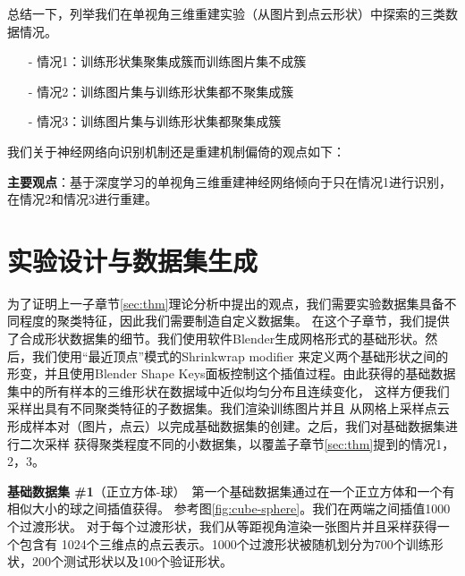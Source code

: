 \documentclass[bachelor, nocolorlinks, printoneside]{seuthesis} %
\begin{document}
\begin{Main}
总结一下，列举我们在单视角三维重建实验（从图片到点云形状）中探索的三类数据情况。
\label{sec:case}
\begin{itemize}
    \item[-] 情况1\label{sec:case1}：训练形状集聚集成簇而训练图片集不成簇
    \item[-] 情况2\label{sec:case2}：训练图片集与训练形状集都不聚集成簇
    \item[-] 情况3\label{sec:case3}：训练图片集与训练形状集都聚集成簇
\end{itemize}

我们关于神经网络向识别机制还是重建机制偏倚的观点如下：

\textbf{主要观点}：基于深度学习的单视角三维重建神经网络倾向于只在情况1进行识别，在情况2和情况3进行重建。


\section{实验设计与数据集生成}\label{sec:dataset}

为了证明上一子章节\ref{sec:thm}理论分析中提出的观点，我们需要实验数据集具备不同程度的聚类特征，因此我们需要制造自定义数据集。
在这个子章节，我们提供了合成形状数据集的细节。我们使用软件Blender生成网格形式的基础形状。然后，我们使用“最近顶点”模式的Shrinkwrap
modifier 来定义两个基础形状之间的形变，并且使用Blender Shape Keys面板控制这个插值过程。由此获得的基础数据集中的所有样本的三维形状在数据域中近似均匀分布且连续变化，
这样方便我们采样出具有不同聚类特征的子数据集。我们渲染训练图片并且
从网格上采样点云形成样本对（图片，点云）以完成基础数据集的创建。之后，我们对基础数据集进行二次采样
获得聚类程度不同的小数据集，以覆盖子章节\ref{sec:thm}提到的情况1，2，3。

\textbf{基础数据集 \#1}（正立方体-球）~第一个基础数据集通过在一个正立方体和一个有相似大小的球之间插值获得。
参考图\ref{fig:cube-sphere}。我们在两端之间插值1000个过渡形状。 对于每个过渡形状，我们从等距视角渲染一张图片并且采样获得一个包含有
1024个三维点的点云表示。1000个过渡形状被随机划分为700个训练形状，200个测试形状以及100个验证形状。



\end{Main}
\end{document}
